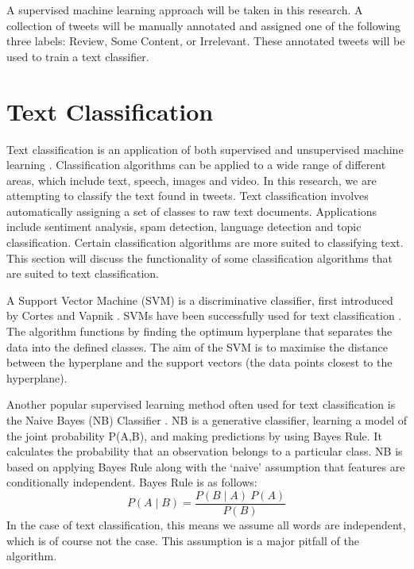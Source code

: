 A supervised machine learning approach will be taken in this research. A collection of tweets will be manually annotated and assigned one of the following three labels: Review, Some Content, or Irrelevant. These annotated tweets will be used to train a text classifier. 

\section{Text Classification}

Text classification is an application of both supervised and unsupervised machine learning \cite{khan2010}. Classification algorithms can be applied to a wide range of different areas, which include text, speech, images and video. In this research, we are attempting to classify the text found in tweets. Text classification involves automatically assigning a set of classes to raw text documents. Applications include sentiment analysis, spam detection, language detection and topic classification. Certain classification algorithms are more suited to classifying text. This section will discuss the functionality of some classification algorithms that are suited to text classification. 



A Support Vector Machine (SVM) is a discriminative classifier, first introduced by Cortes and Vapnik \cite{Vapnik1995,  Vapnik21995}. SVMs have been successfully used for text classification \cite{Joachims1998, tong2001support}. The algorithm functions by finding the optimum hyperplane that separates the data into the defined classes. The aim of the SVM is to maximise the distance between the hyperplane and the support vectors (the data points closest to the hyperplane). 

Another popular supervised learning method often used for text classification is the Naive Bayes (NB) Classifier  \cite{NaiveBayes1998}. NB is a generative classifier, learning a model of the joint probability P(A,B), and making predictions by using Bayes Rule. It calculates the probability that an observation belongs to a particular class. NB is based on applying Bayes Rule along with the ‘naive’ assumption that features are conditionally independent. Bayes Rule is as follows:
\begin{equation}
    P(A\mid B) = \frac{P(B\mid A)\:P(A)}{P(B)}
\end{equation}
In the case of text classification, this means we assume all words are independent, which is of course not the case. This assumption is a major pitfall of the algorithm. 

